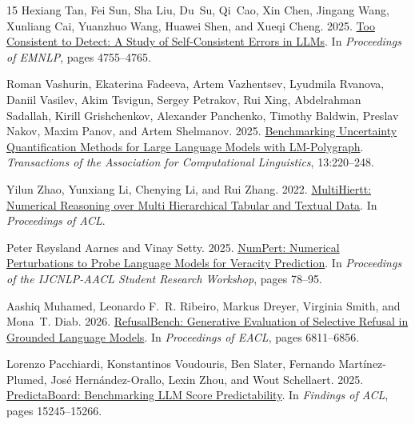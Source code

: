 \begin{thebibliography}{15}
Hexiang Tan, Fei Sun, Sha Liu, Du~Su, Qi~Cao, Xin Chen, Jingang Wang, Xunliang
  Cai, Yuanzhuo Wang, Huawei Shen, and Xueqi Cheng. 2025.
\newblock \href {https://aclanthology.org/2025.emnlp-main.238/} {{Too
  Consistent to Detect: A Study of Self-Consistent Errors in LLMs}}.
\newblock In \emph{Proceedings of EMNLP}, pages 4755--4765.

Roman Vashurin, Ekaterina Fadeeva, Artem Vazhentsev, Lyudmila Rvanova, Daniil
  Vasilev, Akim Tsvigun, Sergey Petrakov, Rui Xing, Abdelrahman Sadallah,
  Kirill Grishchenkov, Alexander Panchenko, Timothy Baldwin, Preslav Nakov,
  Maxim Panov, and Artem Shelmanov. 2025.
\newblock \href {https://aclanthology.org/2025.tacl-1.11/} {{Benchmarking
  Uncertainty Quantification Methods for Large Language Models with
  LM-Polygraph}}.
\newblock \emph{Transactions of the Association for Computational Linguistics},
  13:220--248.

Yilun Zhao, Yunxiang Li, Chenying Li, and Rui Zhang. 2022.
\newblock \href {https://aclanthology.org/2022.acl-long.454/} {{MultiHiertt:
  Numerical Reasoning over Multi Hierarchical Tabular and Textual Data}}.
\newblock In \emph{Proceedings of ACL}.


Peter R{\o}ysland Aarnes and Vinay Setty. 2025.
\newblock \href{https://aclanthology.org/2025.ijcnlp-srw.8/}{NumPert: Numerical Perturbations to Probe Language Models for Veracity Prediction}.
\newblock In \emph{Proceedings of the IJCNLP-AACL Student Research Workshop}, pages 78--95.

Aashiq Muhamed, Leonardo F.~R. Ribeiro, Markus Dreyer, Virginia Smith, and Mona~T. Diab. 2026.
\newblock \href{https://aclanthology.org/2026.eacl-long.321/}{RefusalBench: Generative Evaluation of Selective Refusal in Grounded Language Models}.
\newblock In \emph{Proceedings of EACL}, pages 6811--6856.

Lorenzo Pacchiardi, Konstantinos Voudouris, Ben Slater, Fernando Mart{\'i}nez-Plumed, Jos{\'e} Hern{\'a}ndez-Orallo, Lexin Zhou, and Wout Schellaert. 2025.
\newblock \href{https://aclanthology.org/2025.findings-acl.790/}{PredictaBoard: Benchmarking LLM Score Predictability}.
\newblock In \emph{Findings of ACL}, pages 15245--15266.

\end{thebibliography}
